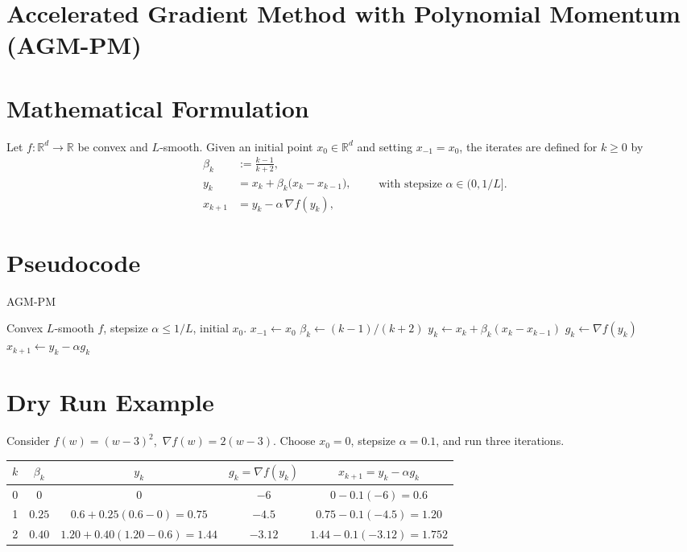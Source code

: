 \documentclass{article}
\begin{document}
\section*{Accelerated Gradient Method with Polynomial Momentum (AGM-PM)}

\section*{Mathematical Formulation}
Let $f:\mathbb{R}^d\rightarrow\mathbb{R}$ be convex and $L$‑smooth.  
Given an initial point $x_{0}\in\mathbb{R}^{d}$ and setting $x_{-1}=x_{0}$, the iterates are defined for $k\ge 0$ by
\[
\boxed{
\begin{aligned}
\beta_{k} &:= \frac{k-1}{k+2},\\[4pt]
y_{k}    &= x_{k}+ \beta_{k}\bigl(x_{k}-x_{k-1}\bigr),\\[4pt]
x_{k+1}  &= y_{k}-\alpha \,\nabla f\!\left(y_{k}\right),
\end{aligned}}
\qquad\text{with stepsize }\alpha\in(0,1/L].
\]

\section*{Pseudocode}
\begin{algorithm}[H]
\caption{AGM-PM}
\begin{algorithmic}[1]
\REQUIRE Convex $L$‑smooth $f$, stepsize $\alpha\le 1/L$, initial $x_{0}$.
\STATE $x_{-1}\gets x_{0}$
    \STATE $\beta_{k}\gets (k-1)/(k+2)$
    \STATE $y_{k}\gets x_{k}+ \beta_{k}(x_{k}-x_{k-1})$
    \STATE $g_{k}\gets \nabla f(y_{k})$
    \STATE $x_{k+1}\gets y_{k}-\alpha g_{k}$
\ENDFOR
\end{algorithmic}
\end{algorithm}

\section*{Dry Run Example}
Consider $f(w)=(w-3)^{2}$, $\,\nabla f(w)=2(w-3)$.  
Choose $x_{0}=0$, stepsize $\alpha=0.1$, and run three iterations.

\begin{center}
\begin{tabular}{c|c|c|c|c}
$k$ & $\beta_{k}$ & $y_{k}$ & $g_{k}= \nabla f(y_{k})$ & $x_{k+1}=y_{k}-\alpha g_{k}$ \\ \hline
0 & $0$ & $0$ & $-6$ & $0-0.1(-6)=0.6$ \\[4pt]
1 & $0.25$ & $0.6+0.25(0.6-0)=0.75$ & $-4.5$ & $0.75-0.1(-4.5)=1.20$ \\[4pt]
2 & $0.40$ & $1.20+0.40(1.20-0.6)=1.44$ & $-3.12$ & $1.44-0.1(-3.12)=1.752$ 
\end{tabular}
\end{center}
\end{document}
